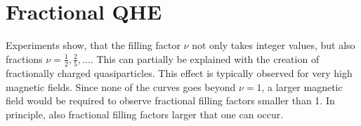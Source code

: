 \section{Fractional QHE}

Experiments show, that the filling factor $\nu$ not only takes integer values, but also fractions $\nu=\frac{1}{2}, \frac{2}{5}, ...$.
This can partially be explained with the creation of fractionally charged quasiparticles.
This effect is typically observed for very high magnetic fields.
Since none of the curves goes beyond $\nu = 1$, 
a larger magnetic field would be required to observe fractional filling factors smaller than 1.
In principle, also fractional filling factors larger that one can occur.







